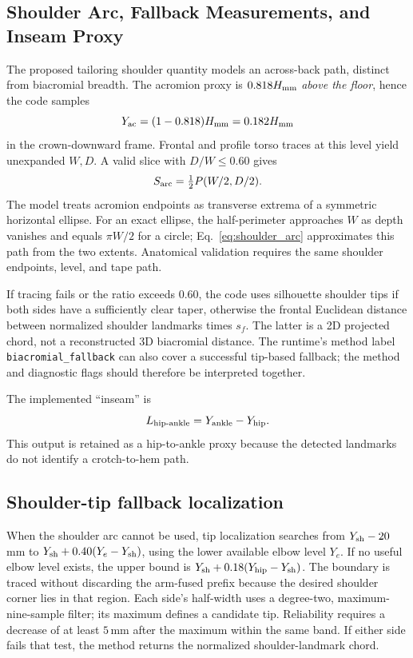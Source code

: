 \documentclass[11pt,a4paper]{article}
\numberwithin{equation}{section}
\begin{document}
\subsection{Shoulder Arc, Fallback Measurements, and Inseam Proxy}
\label{subsec:shoulder_arc}
The proposed tailoring shoulder quantity models an across-back path, distinct from biacromial breadth. The acromion proxy is $0.818H_{\rm mm}$ \emph{above the floor}, hence the code samples
\begin{equation}
Y_{\rm ac}=(1-0.818)H_{\rm mm}=0.182H_{\rm mm}
\end{equation}
in the crown-downward frame. Frontal and profile torso traces at this level yield unexpanded $W,D$. A valid slice with $D/W\le0.60$ gives
\begin{equation}
S_{\rm arc}=\tfrac12P(W/2,D/2).
\label{eq:shoulder_arc}
\end{equation}
The model treats acromion endpoints as transverse extrema of a symmetric horizontal ellipse. For an exact ellipse, the half-perimeter approaches $W$ as depth vanishes and equals $\pi W/2$ for a circle; Eq.~\eqref{eq:shoulder_arc} approximates this path from the two extents. Anatomical validation requires the same shoulder endpoints, level, and tape path.

If tracing fails or the ratio exceeds $0.60$, the code uses silhouette shoulder tips if both sides have a sufficiently clear taper, otherwise the frontal Euclidean distance between normalized shoulder landmarks times $s_f$. The latter is a 2D projected chord, not a reconstructed 3D biacromial distance. The runtime's method label \texttt{biacromial\_fallback} can also cover a successful tip-based fallback; the method and diagnostic flags should therefore be interpreted together.

\label{subsec:linear_measurements}
The implemented ``inseam'' is
\begin{equation}
L_{\rm hip\text{-}ankle}=Y_{\rm ankle}-Y_{\rm hip}.
\end{equation}
This output is retained as a hip-to-ankle proxy because the detected landmarks do not identify a crotch-to-hem path.

\subsection{Shoulder-tip fallback localization}
When the shoulder arc cannot be used, tip localization searches from $Y_{\rm sh}-20$\,mm to $Y_{\rm sh}+0.40(Y_e-Y_{\rm sh})$, using the lower available elbow level $Y_e$. If no useful elbow level exists, the upper bound is $Y_{\rm sh}+0.18(Y_{\rm hip}-Y_{\rm sh})$. The boundary is traced without discarding the arm-fused prefix because the desired shoulder corner lies in that region. Each side's half-width uses a degree-two, maximum-nine-sample filter; its maximum defines a candidate tip. Reliability requires a decrease of at least $5$\,mm after the maximum within the same band. If either side fails that test, the method returns the normalized shoulder-landmark chord.
\end{document}
